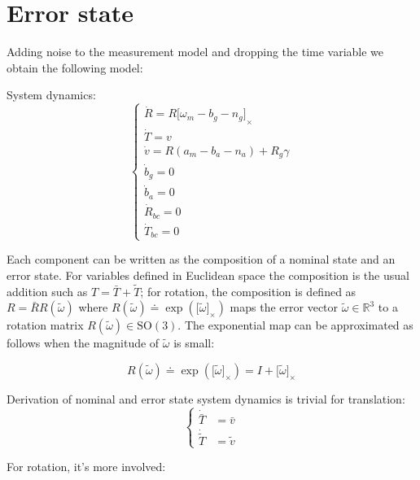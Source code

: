 \documentclass[letter,10pt]{article}
\newcommand{\SO}[1]{ \mathrm{SO(#1)} }
\newcommand{\real}{\mathbb{R}}
\newcommand{\asym}[1]{{\lbrack #1\rbrack}_\times{}}
\begin{document}
\section{Error state}
\label{sect-model}

Adding noise to the measurement model and dropping the time variable we obtain the following model:

System dynamics:
\begin{equation}
 \begin{cases}
 \dot R = R \asym{\omega_m-b_g-n_g}\\
 \dot T = v\\
 \dot v = R(a_m-b_a-n_a) + R_g \gamma \\
 \dot b_g = 0 \\
 \dot b_a = 0 \\
 \dot R_{bc} = 0 \\
 \dot T_{bc} = 0
 \end{cases}
\end{equation}

Each component can be written as the composition of a nominal state and an error state. For variables defined in Euclidean space the composition is the usual addition such as $T=\bar T + \tilde T$; for rotation, the composition is defined as $R=\bar R R(\tilde \omega)$ where $R(\tilde \omega)\doteq \exp(\asym{\tilde \omega})$ maps the error vector $\tilde \omega \in \real^3$ to a rotation matrix $R(\tilde \omega) \in \SO{3}$. The exponential map can be approximated as follows when the magnitude of $\tilde \omega$ is small:

\begin{equation}
R(\tilde \omega) \doteq \exp(\asym{\tilde \omega})= I + \asym{\tilde \omega}
\end{equation}


Derivation of nominal and error state system dynamics is trivial for translation:
\begin{equation}
\begin{cases}
\dot{\bar T} &= \bar v\\
\dot{\tilde T} &= \tilde v
\end{cases}
\end{equation}

For rotation, it's more involved:
\end{document}
